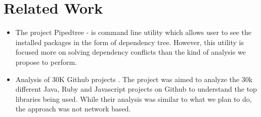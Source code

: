 \section{Related Work} \label{relwork}
\begin {itemize}
\item
The project Pipedtree - \cite{www-pipdeptree} is command
line utility which allows user to see the installed packages in the form of
dependency tree. However, this utility is focused more on solving dependency
conflicts than the kind of analysis we propose to perform.

\item
Analysis of 30K Github projects \cite{www-takipi}.
The project was aimed to analyze the 30k different Java, Ruby and Javascript
projects on Github to understand the top libraries being used. While their
analysis was similar to what we plan to do, the approach was not network based.

\end {itemize}
